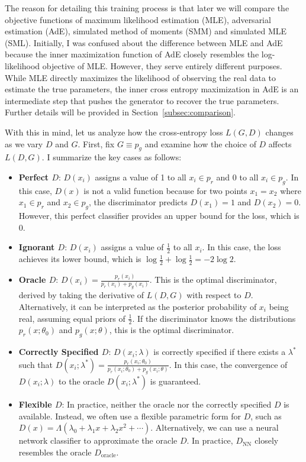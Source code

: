 \documentclass[12pt]{article}
\begin{document}
The reason for detailing this training process is that later we will compare
the objective functions of maximum likelihood estimation (MLE), adversarial
estimation (AdE), simulated method of moments (SMM) and simulated MLE (SML).
Initially, I was confused about the difference between MLE and AdE because the
inner maximization function of AdE closely resembles the log-likelihood
objective of MLE. However, they serve entirely different purposes. While MLE
directly maximizes the likelihood of observing the real data to estimate the
true parameters, the inner cross entropy maximization in AdE is an intermediate
step that pushes the generator to recover the true parameters. Further details
will be provided in Section~\ref{subsec:comparison}.

With this in mind, let us analyze how the cross-entropy loss \(L(G, D)\)
changes as we vary \(D\) and \(G\). First, fix \(G \equiv p_g\) and examine how
the choice of \(D\) affects \(L(D, G)\). I summarize the key cases as follows:
\begin{itemize}
    \item \textbf{Perfect \(D\)}: \(D(x_i)\) assigns a value of 1 to all \(x_i \in p_r\) and 0 to all \(x_i \in p_g\). In this case, \(D(x)\) is not a valid function because for two points \(x_1 = x_2\) where \(x_1 \in p_r\) and \(x_2 \in p_g\), the discriminator predicts \(D(x_1) = 1\) and \(D(x_2) = 0\). However, this perfect classifier provides an upper bound for the loss, which is 0.
    \item \textbf{Ignorant \(D\)}: \(D(x_i)\) assigns a value of \(\frac{1}{2}\) to all \(x_i\). In this case, the loss achieves its lower bound, which is \(\log \frac{1}{2} + \log \frac{1}{2} = -2\log 2\).
    \item \textbf{Oracle \(D\)}: \(D(x_i) = \frac{p_r(x_i)}{p_r(x_i) + p_g(x_i)}\). This is the optimal discriminator, derived by taking the derivative of \(L(D, G)\) with respect to \(D\). Alternatively, it can be interpreted as the posterior probability of \(x_i\) being real, assuming equal priors of \(\frac{1}{2}\). If the discriminator knows the distributions \(p_r(x; \theta_0)\) and \(p_g(x; \theta)\), this is the optimal discriminator.
    \item \textbf{Correctly Specified \(D\)}: \(D(x_i; \lambda)\) is correctly specified if there exists a \(\lambda^*\) such that \(D(x_i; \lambda^*) = \frac{p_r(x_i; \theta_0)}{p_r(x_i; \theta_0) + p_g(x_i; \theta)}\). In this case, the convergence of \(D(x_i; \lambda)\) to the oracle \(D(x_i; \lambda^*)\) is guaranteed.
    \item \textbf{Flexible \(D\)}: In practice, neither the oracle nor the correctly specified \(D\) is available. Instead, we often use a flexible parametric form for \(D\), such as \(D(x) = \Lambda(\lambda_0 + \lambda_1 x + \lambda_2 x^2 + \cdots)\). Alternatively, we can use a neural network classifier to approximate the oracle \(D\). In practice, \(D_\text{NN}\) closely resembles the oracle \(D_\text{oracle}\).
\end{itemize}
\end{document}
